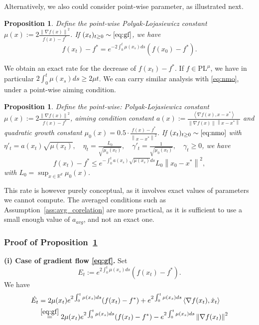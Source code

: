 \documentclass{article}
\def\R{{\mathbb{R}}}
\def\xcont{(x_t)_{t\ge 0}}
\def\pl{{\text{PL}^\mu}}
\newcommand{\norm}[1]{\left\lVert#1\right\rVert}
\newcommand{\dotprod}[1]{\left< #1\right>}
\theoremstyle{plain}
\newtheorem{proposition}[theorem]{Proposition}
\theoremstyle{definition}
\theoremstyle{remark}
\begin{document}
Alternatively, we also could consider point-wise parameter, as illustrated next.
\begin{proposition}\label{prop:exact_gf}
    Define the point-wise Polyak-Lojasiewicz constant $\mu(x) :=  2\frac{\norm{\nabla f(x)}^2}{f(x)-f^\ast}$. If $\xcont \sim \eqref{eq:gf}$, we have
    $$f(x_t)-f^\ast = e^{-2\int_{0}^t \mu(x_s)ds}(f(x_0)-f^\ast).$$
\end{proposition}
We obtain an exact rate for the decrease of $f(x_t)-f^\ast$. If $f\in \pl$, we have in particular $2\int_0^t \mu(x_s)ds \ge 2\mu t$. We can carry similar analysis with \eqref{eq:nmo}, under a point-wise aiming condition.

\begin{proposition}\label{prop:exact_nmo}
    Define the point-wise: Polyak-Lojasiewicz constant $\mu(x) :=  2\frac{\norm{\nabla f(x)}^2}{f(x)-f^\ast}$, aiming condition constant $a(x) := \frac{\dotprod{\nabla f(x),x-x^\ast}}{\norm{\nabla f(x)}\norm{x-x^\ast}}$ and quadratic growth constant $\mu_0(x) = 0.5\cdot\frac{f(x)-f^\ast}{\norm{x-x^\ast}^2}$.
   If $\xcont \sim \eqref{eq:nmo}$ with $ \eta'_t = a(x_t)\sqrt{\mu(x_t)},\quad \eta_t = \frac{L_0}{\sqrt{\mu_0(x_t)}}, \quad \gamma'_t = \frac{1}{\sqrt{\mu_0(x_t)}},\quad \gamma_t \ge 0$, we have
    $$f(x_t)-f^\ast \le e^{-\int_0^t a(x_s)\sqrt{\mu(x_s)}ds}L_0\norm{x_0-x^\ast}^2,$$
    with $L_0 = \sup_{x\in \R^d} \mu_0(x)$.
\end{proposition}
This rate is however purely conceptual, as it involves exact values of parameters we cannot compute. The averaged conditions such as Assumption~\ref{ass:avg_corelation} are more practical, as it is sufficient to use a small enough value of $a_{avg}$, and not an exact one.
\subsubsection{Proof of Proposition~\ref{prop:exact_gf}}
\textbf{(i) Case of gradient flow \eqref{eq:gf}. \:}
    Set
    $$E_t:= e^{2\int_{0}^t \mu(x_s)ds}(f(x_t)-f^\ast). $$
    We have
    \begin{equation}
        \begin{aligned}\label{eq:pl_avg:1}
                    \dot{E_t} &= 2\mu(x_t)e^{2\int_{0}^t \mu(x_s)ds}(f(x_t)-f^\ast) + e^{2\int_{0}^t \mu(x_s)ds}\dotprod{\nabla f(x_t),\dot x_t}\\
        &\overset{\eqref{eq:gf}}{=} 2\mu(x_t)e^{2\int_{0}^t \mu(x_s)ds}(f(x_t)-f^\ast) - e^{2\int_{0}^t \mu(x_s)ds}\norm{\nabla f(x_t)}^2
        \end{aligned}
    \end{equation}
\end{document}
